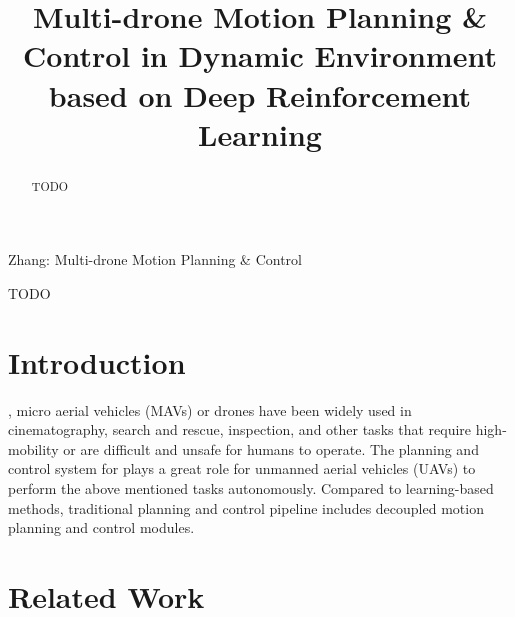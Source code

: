 \documentclass[letterpaper,journal,twoside]{IEEEtran}
\begin{document}
\title{Multi-drone Motion Planning \& Control in Dynamic Environment based on Deep Reinforcement Learning}

\author{
}

\maketitle

\begingroup
\renewcommand\thefootnote{\textsuperscript{1}}
\endgroup

%
{Zhang: Multi-drone Motion Planning \& Control}



\begin{abstract}
TODO
\end{abstract}

\begin{IEEEkeywords}
  TODO
\end{IEEEkeywords}

\section{Introduction}
, micro aerial vehicles (MAVs) or 
drones have been widely used in cinematography, search and 
rescue, inspection, and other tasks that require 
high-mobility or are difficult and unsafe for humans to 
operate. 
The planning and control system for plays a great role for 
unmanned aerial vehicles (UAVs) to perform the 
above mentioned tasks autonomously.
Compared to learning-based methods, traditional planning 
and control pipeline includes decoupled 
motion planning and control modules.

\section{Related Work}
\end{document}
